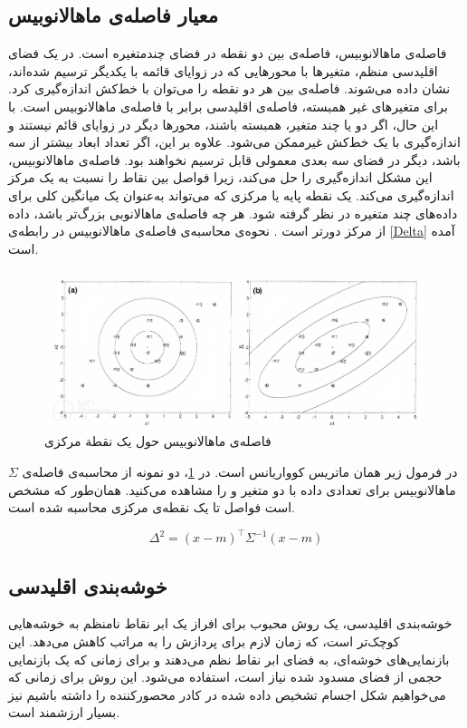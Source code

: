 \subsection{معیار فاصله‌ی ماهالانوبیس}
فاصله‌ی ماهالانوبیس، فاصله‌ی بین دو نقطه در فضای چندمتغیره است. در یک فضای اقلیدسی منظم، متغیرها با محورهایی که در زوایای قائمه با یکدیگر ترسیم شده‌اند، نشان داده می‌شوند. فاصله‌ی بین هر دو نقطه را می‌توان با خط‌کش اندازه‌گیری کرد. برای متغیرهای غیر همبسته، فاصله‌ی اقلیدسی برابر با فاصله‌ی ماهالانوبیس است. با این ‌حال، اگر دو یا چند متغیر، همبسته باشند، محورها دیگر در زوایای قائم نیستند و اندازه‌گیری با یک خط‌کش غیرممکن می‌شود. علاوه بر این، اگر تعداد ابعاد بیشتر از سه باشد، دیگر در فضای سه‌ بعدی معمولی قابل ترسیم نخواهند بود. فاصله‌ی ماهالانوبیس، این مشکل اندازه‌گیری را حل می‌کند، زیرا فواصل بین نقاط را نسبت به یک مرکز اندازه‌گیری می‌کند. یک نقطه پایه یا مرکزی که می‌تواند به‌عنوان یک میانگین کلی برای داده‌های چند متغیره در نظر گرفته شود. هر چه فاصله‌ی ماهالانوبی بزرگ‌تر باشد، داده از مرکز دورتر است \cite{de2000mahalanobis}. نحوه‌ی محاسبه‌ی فاصله‌ی ماهالانوبیس در رابطه‌ی \ref{Delta} آمده است.\begin{figure}[h!]
	\centering\includegraphics[width=1\linewidth]{figures/mahalanobis_figure}
	\caption{فاصله‌ی ماهالانوبیس حول یک نقطة مرکزی \cite{de2000mahalanobis}}\label{fig:mahalanobis_figure}
\end{figure} $\Sigma$ در فرمول زیر همان ماتریس کوواریانس است. در \cref{fig:mahalanobis_figure}، دو نمونه از محاسبه‌ی فاصله‌ی ماهالانوبیس برای تعدادی داده با دو متغیر  و  را مشاهده می‌کنید. همان‌طور که مشخص است فواصل تا یک نقطه‌ی مرکزی محاسبه شده است.  

\begin{equation} \label{Delta}
	\Delta^2 = \left( x-m\right)^\top\Sigma^{-1}\left( x-m\right)
\end{equation}

\subsection{خوشه‌بندی اقلیدسی}
خوشه‌بندی اقلیدسی، یک روش محبوب برای افراز یک ابر نقاط نامنظم به خوشه‌هایی کوچک‌تر است، که زمان لازم برای پردازش را به مراتب کاهش می‌دهد. این بازنمایی‌های خوشه‌ای، به فضای ابر نقاط نظم می‌دهند و برای زمانی که یک بازنمایی حجمی از فضای مسدود شده نیاز است، استفاده می‌شود. این روش برای زمانی که می‌خواهیم شکل اجسام تشخیص داده‌ شده در کادر محصورکننده را داشته باشیم نیز بسیار ارزشمند است. 

